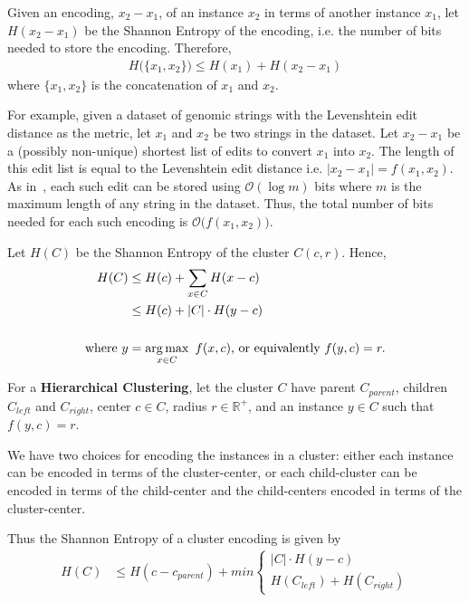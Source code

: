 Given an encoding, $x_2 - x_1$, of an instance $x_2$ in terms of another instance $x_1$, let $H(x_2 - x_1)$ be the Shannon Entropy of the encoding, i.e. the number of bits needed to store the encoding.
Therefore,
\begin{align*}
    H \big( \{ x_1, x_2 \} \big) \leq H(x_1) + H(x_2 - x_1)
\end{align*}
where $\{ x_1, x_2 \}$ is the concatenation of $x_1$ and $x_2$.

For example, given a dataset of genomic strings with the Levenshtein edit distance as the metric, let $x_1$ and $x_2$ be two strings in the dataset.
Let $x_2 - x_1$ be a (possibly non-unique) shortest list of edits to convert $x_1$ into $x_2$.
The length of this edit list is equal to the Levenshtein edit distance i.e. $|x_2 - x_1| = f(x_1, x_2)$.
As in~\cite{berger2020levenshtein}, each such edit can be stored using $\mathcal{O}(\log m)$ bits where $m$ is the maximum length of any string in the dataset.
Thus, the total number of bits needed for each such encoding is $\mathcal{O} \big( f(x_1, x_2) \big)$.

Let $H(C)$ be the Shannon Entropy of the cluster $C(c, r)$.
Hence,
\begin{align*}
    H (C) &\leq H(c) + \sum_{x \in C} H(x - c) \\
    &\leq H(c) + |C| \cdot H(y - c) \\ \\
    \text{where} \ y &= \operatorname*{arg\,max}_{x \in C} \ f(x, c) \text{, or equivalently} \ f(y, c) = r.
\end{align*}

For a \textbf{Hierarchical Clustering}, let the cluster $C$ have 
parent $C_{parent}$, 
children $C_{left}$ and $C_{right}$, 
center $c \in C$, 
radius $r \in \mathbb{R}^+$, 
and an instance $y \in C$ such that $f(y, c) = r$.

We have two choices for encoding the instances in a cluster:
either each instance can be encoded in terms of the cluster-center, 
or each child-cluster can be encoded in terms of the child-center and the child-centers encoded in terms of the cluster-center.

Thus the Shannon Entropy of a cluster encoding is given by
\begin{align}
    \label{eq:hierarchical-shannon-entropy}
    H(C) &\leq H(c - c_{parent}) + min \begin{cases}
        |C| \cdot H(y - c) \\
        H(C_{left}) + H(C_{right})
    \end{cases}
\end{align}

